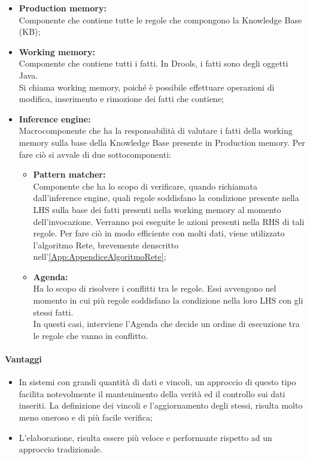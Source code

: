 	\begin{itemize}
		\item \textbf{Production memory:} \\ Componente che contiene tutte le regole che compongono la Knowledge Base (KB);
		\item  \textbf{Working memory: } \\ Componente che contiene tutti i fatti. In Drools, i fatti sono degli oggetti Java. \\  Si chiama working memory, poiché  è possibile effettuare operazioni di modifica, inserimento e rimozione dei fatti che contiene;
		\item \textbf{Inference engine: } \\ Macrocomponente che ha la responsabilità di valutare i fatti della working memory sulla base della Knowledge Base presente in Production memory. Per fare ciò si avvale di due sottocomponenti:
		\begin{itemize}
			\item \textbf{Pattern matcher: } \\ Componente che ha lo scopo di verificare, quando richiamata dall'inference engine, quali regole soddisfano la condizione presente nella LHS sulla base dei fatti presenti nella working memory al momento dell'invocazione. Verranno poi eseguite le azioni  presenti nella RHS di tali regole. Per fare ciò in modo efficiente con molti dati, viene utilizzato l'algoritmo Rete, brevemente denscritto nell'\autoref{App:AppendiceAlgoritmoRete};
			\item \textbf{Agenda: } \\ Ha lo scopo di risolvere i conflitti tra le regole. Essi avvengono nel momento in cui più regole soddisfano la condizione nella loro LHS  con gli stessi fatti. \\ In questi casi, interviene l'Agenda che decide un ordine di esecuzione tra le regole che vanno in conflitto.
		\end{itemize}
	\end{itemize}
\paragraph{Vantaggi}
	\begin{itemize}
		\item In sistemi con grandi quantità di dati e vincoli, un approccio di questo tipo facilita notevolmente il mantenimento della verità ed il controllo sui dati inseriti. La definizione dei vincoli e l'aggiornamento degli stessi, risulta molto meno oneroso e di più facile verifica;
		\item L'elaborazione, risulta essere più veloce e performante rispetto ad un approccio tradizionale.
	\end{itemize}
